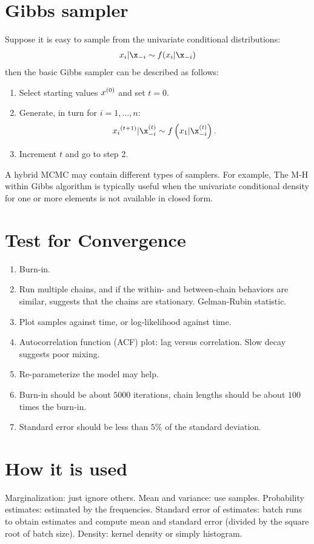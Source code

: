 \section{Gibbs sampler}
Suppose it is easy to sample from the univariate conditional distributions:
\begin{align}
x_i | \x_{-i} \sim f(x_i | \x_{-i})
\end{align}
then the basic Gibbs sampler can be described as follows:
\begin{enumerate}
\item Select starting values ${x}^{(0)}$ and set $t=0$.
\item Generate, in turn for $i = 1, \dots, n$:
\begin{align}
\dual{x_i}{t+1} | \x_{-i}^{(t)} \sim f\left(x_1 | \x_{-i}^{(t)}\right).
\end{align}
\item Increment $t$ and go to step 2.
\end{enumerate}
A hybrid MCMC may contain different types of samplers. For example, The M-H within Gibbs algorithm is typically useful when the univariate conditional density for one or more elements is not available in closed form.

\section{Test for Convergence}
\begin{enumerate}
\item Burn-in.
\item Run multiple chains, and if the within- and between-chain behaviors are similar, suggests that the chains are stationary. Gelman-Rubin statistic.
\item Plot samples against time, or log-likelihood against time.
\item Autocorrelation function (ACF) plot: lag versus correlation. Slow decay suggests poor mixing.
\item Re-parameterize the model may help.
\item Burn-in should be about $5000$ iterations, chain lengths should be about $100$ times the burn-in.
\item Standard error should be less than $5\%$ of the standard deviation.
\end{enumerate}

\section{How it is used}
Marginalization: just ignore others. Mean and variance: use samples. Probability estimates: estimated by the frequencies. Standard error of estimates: batch runs to obtain estimates and compute mean and standard error (divided by the square root of batch size). Density: kernel density or simply histogram.


